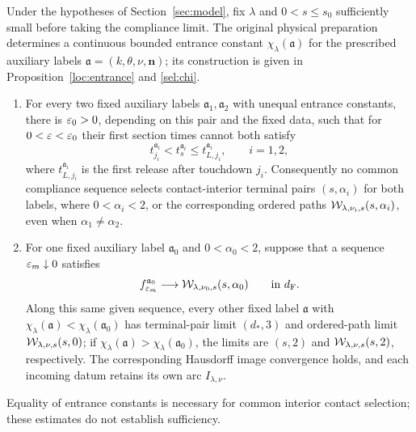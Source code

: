 \begingroup
\renewcommand{\thetheorem}{C}
\begin{theorem}
\label{thm:contact-selection}
Under the hypotheses of Section~\ref{sec:model}, fix $\lambda$ and
$0<s\le s_0$ sufficiently small before taking the compliance limit.
The original physical preparation determines a continuous bounded
entrance constant $\chi_\lambda(\mathfrak a)$ for the prescribed
auxiliary labels $\mathfrak a=(k,\theta,\nu,\mathbf n)$; its
construction is given in Proposition~\ref{loc:entrance} and
\eqref{sel:chi}.
\begin{enumerate}[label=\textup{(\roman*)},leftmargin=*]
\item For every two fixed auxiliary labels
$\mathfrak a_1,\mathfrak a_2$ with unequal entrance constants, there
is $\varepsilon_0>0$, depending on this pair and the fixed data, such that
for $0<\varepsilon<\varepsilon_0$ their first section times cannot both satisfy
\[
 t_{j_i}^{\mathfrak a_i}<t_s^{\mathfrak a_i}
       \le t_{L,j_i}^{\mathfrak a_i},\qquad i=1,2,
\]
where $t_{L,j_i}^{\mathfrak a_i}$ is the first release after
touchdown $j_i$. Consequently no common compliance sequence selects
contact-interior terminal pairs $(s,\alpha_i)$ for both labels,
where $0<\alpha_i<2$, or the corresponding ordered paths
$\mathcal W_{\lambda,\nu_i,s}(s,\alpha_i)$, even when
$\alpha_1\ne\alpha_2$.
\item For one fixed auxiliary label $\mathfrak a_0$ and
$0<\alpha_0<2$, suppose that a sequence $\varepsilon_m\downarrow0$ satisfies
\[
 f_{\varepsilon_m}^{\mathfrak a_0}
   \longrightarrow\mathcal W_{\lambda,\nu_0,s}(s,\alpha_0)
   \qquad\hbox{in }d_{\mathrm F}.
\]
Along this same given sequence, every other fixed label
$\mathfrak a$ with $\chi_\lambda(\mathfrak a)
<\chi_\lambda(\mathfrak a_0)$ has terminal-pair limit $(d_*,3)$
and ordered-path limit $\mathcal W_{\lambda,\nu,s}(s,0)$; if
$\chi_\lambda(\mathfrak a)>\chi_\lambda(\mathfrak a_0)$, the limits
are $(s,2)$ and $\mathcal W_{\lambda,\nu,s}(s,2)$, respectively.
The corresponding Hausdorff image convergence holds, and each
incoming datum retains its own arc $I_{\lambda,\nu}$.
\end{enumerate}
Equality of entrance constants is necessary for common interior
contact selection; these estimates do not establish sufficiency.
\end{theorem}
\endgroup

